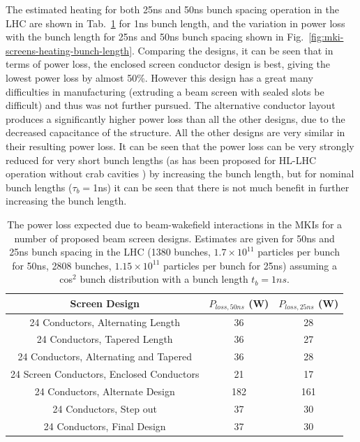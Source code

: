 The estimated heating for both 25ns and 50ns bunch spacing operation in the LHC are shown in Tab.~\ref{tab:heating-mki-screen-designs} for 1ns bunch length, and the variation in power loss with the bunch length for 25ns and 50ns bunch spacing shown in Fig.~\ref{fig:mki-screens-heating-bunch-length}. Comparing the designs, it can be seen that in terms of power loss, the enclosed screen conductor design is best, giving the lowest power loss by almost 50\%. However this design has a great many difficulties in manufacturing (extruding a beam screen with sealed slots be difficult) and thus was not further pursued. The alternative conductor layout produces a significantly higher power loss than all the other designs, due to the decreased capacitance of the structure. All the other designs are very similar in their resulting power loss. It can be seen that the power loss can be very strongly reduced for very short bunch lengths (as has been proposed for HL-LHC operation without crab cavities \cite{Bruning:beamParameters}) by increasing the bunch length, but for nominal bunch lengths ($\tau_{b}=$1ns) it can be seen that there is not much benefit in further increasing the bunch length.

\begin{table}
\caption{The power loss expected due to beam-wakefield interactions in the MKIs for a number of proposed beam screen designs. Estimates are given for 50ns and 25ns bunch spacing in the LHC (1380 bunches, $1.7 \times 10^{11}$ particles per bunch for 50ns, 2808 bunches, $1.15 \times 10^{11}$ particles per bunch for 25ns) assuming a cos$^{2}$ bunch distribution with a bunch length $t_{b}=1ns$.}
\label{tab:heating-mki-screen-designs}
\begin{center}
\begin{tabular}{c | c | c}
Screen Design & $P_{loss,50ns}$ (W) & $P_{loss,25ns}$ (W) \\ \hline 
24 Conductors, Alternating Length & 36 & 28 \\ \hline %
24 Conductors, Tapered Length & 36 & 27 \\ \hline %
24 Conductors, Alternating and Tapered & 36 & 28 \\ \hline %
24 Screen Conductors, Enclosed Conductors & 21 & 17 \\ \hline %
24 Conductors, Alternate Design & 182 & 161 \\ \hline %
24 Conductors, Step out & 37 & 30 \\ \hline %
24 Conductors, Final Design & 37 & 30 \\ %
\end{tabular}
\end{center}
\end{table}

